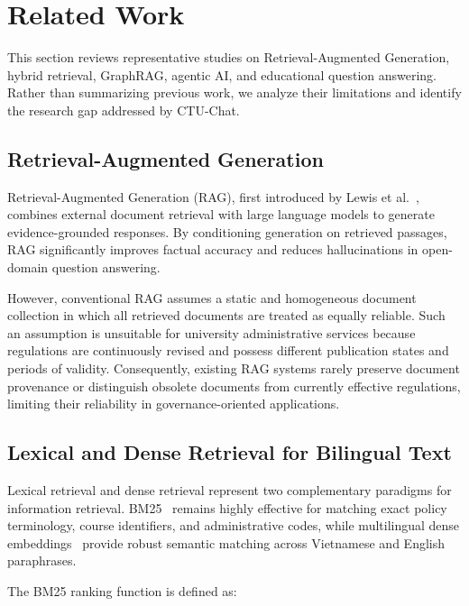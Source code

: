 \section{Related Work}
\label{sec:related}

This section reviews representative studies on Retrieval-Augmented Generation, hybrid retrieval, GraphRAG, agentic AI, and educational question answering. Rather than summarizing previous work, we analyze their limitations and identify the research gap addressed by CTU-Chat.

\subsection{Retrieval-Augmented Generation}

Retrieval-Augmented Generation (RAG), first introduced by Lewis et al.~\cite{lewis2020rag}, combines external document retrieval with large language models to generate evidence-grounded responses. By conditioning generation on retrieved passages, RAG significantly improves factual accuracy and reduces hallucinations in open-domain question answering.

However, conventional RAG assumes a static and homogeneous document collection in which all retrieved documents are treated as equally reliable. Such an assumption is unsuitable for university administrative services because regulations are continuously revised and possess different publication states and periods of validity. Consequently, existing RAG systems rarely preserve document provenance or distinguish obsolete documents from currently effective regulations, limiting their reliability in governance-oriented applications.

\subsection{Lexical and Dense Retrieval for Bilingual Text}

Lexical retrieval and dense retrieval represent two complementary paradigms for information retrieval. BM25~\cite{robertson2009bm25} remains highly effective for matching exact policy terminology, course identifiers, and administrative codes, while multilingual dense embeddings~\cite{chen2024bgem3} provide robust semantic matching across Vietnamese and English paraphrases.

The BM25 ranking function is defined as:

